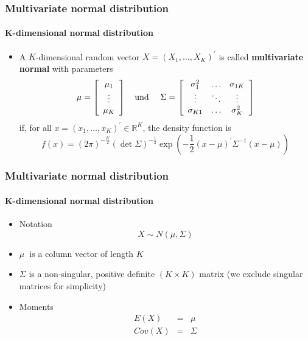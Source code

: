 \documentclass[notes=show]{beamer}
\begin{document}
\begin{frame}\frametitle{Multivariate normal distribution}\framesubtitle{K-dimensional normal distribution}
\begin{itemize}
    \item A $K$-dimensional random vector $X=\left( X_{1},\ldots ,X_{K}\right)^{\prime }$ is called \textbf{multivariate normal} with parameters
        \begin{equation*}
            \mu =\left[
            \begin{array}{c}
            \mu _{1} \\
            \vdots \\
            \mu _{K}
            \end{array}
            \right] \quad \text{und \quad }\Sigma =\left[
            \begin{array}{ccc}
            \sigma _{1}^{2} & \ldots & \sigma _{1K} \\
            \vdots & \ddots & \vdots \\
            \sigma _{K1} & \ldots & \sigma _{K}^{2}
            \end{array}
            \right]
        \end{equation*}
        if, for all $x=\left( x_{1},\ldots ,x_{K}\right) ^{\prime }\in \mathbb{R}^{K} $, the density function is
        \begin{equation*}
            f\left( x\right) =\left( 2\pi \right) ^{-\frac{K}{2}}\left( \det \Sigma \right) ^{-\frac{1}{2}}\exp \left( -\frac{1}{2}\left( x-\mu \right) ^{\prime }\Sigma ^{-1}\left( x-\mu \right) \right)
        \end{equation*}
\end{itemize}
\end{frame}


\begin{frame}\frametitle{Multivariate normal distribution}\framesubtitle{K-dimensional normal distribution}
\begin{itemize}
    \item Notation
        \begin{equation*}
            X\sim N\left( \mu ,\Sigma \right)
        \end{equation*}
    \item $\mu $\textbf{\ }is a column vector of length $K$
    \item $\Sigma $ is a non-singular, positive definite $(K\times K)$ matrix\newline
        (we exclude singular matrices for simplicity)
    \item Moments
        \begin{eqnarray*}
            E\left( X\right) &=&\mu \\
            Cov\left( X\right) &=&\Sigma
        \end{eqnarray*}
\end{itemize}
\end{frame}
\end{document}
